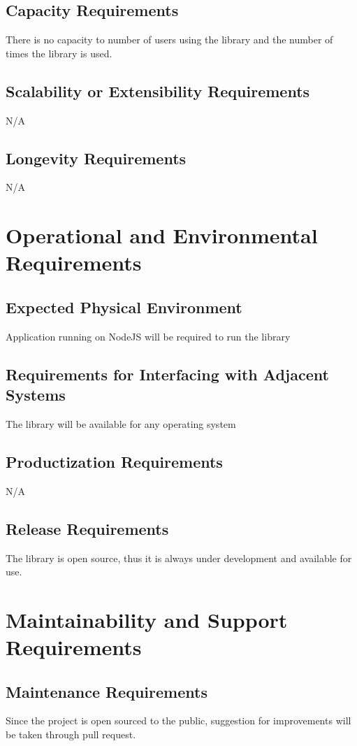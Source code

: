 \documentclass[12pt]{article}
\begin{document}
\subsection {Capacity Requirements}
There is no capacity to number of users using the library and the number of times the library is used.


\subsection {Scalability or Extensibility Requirements}
N/A

\subsection {Longevity Requirements}
N/A

\section {Operational and Environmental Requirements}

\subsection {Expected Physical Environment}
Application running on NodeJS will be required to run the library

\subsection {Requirements for Interfacing with Adjacent Systems}
The library will be available for any operating system

\subsection {Productization Requirements}
N/A

\subsection {Release Requirements}
The library is open source, thus it is always under development and available for use.

\section {Maintainability and Support Requirements}

\subsection {Maintenance Requirements}
Since the project is open sourced to the public, suggestion for improvements will be taken through pull request.
\end{document}
